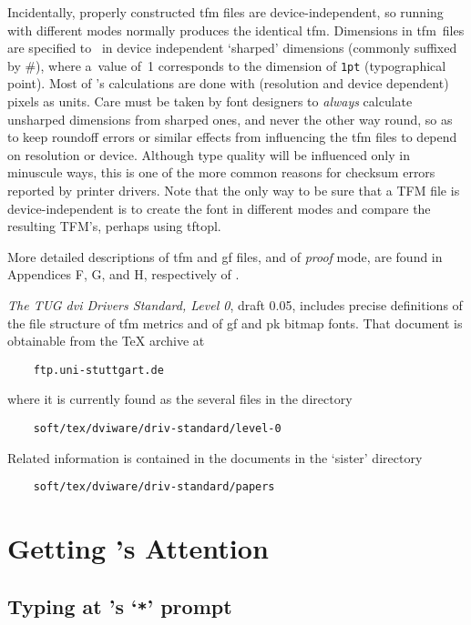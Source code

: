 Incidentally, properly constructed {\sc tfm} files are
device-independent, so running \MF{} with different modes normally
produces the identical {\sc tfm}.
Dimensions in {\sc tfm}~files are specified to~\MF{} in device
independent `sharped' dimensions (commonly suffixed by \#), where
a~value of~1 corresponds to the dimension of {\tt 1pt} (typographical
point).  Most of \MF{}'s calculations are done with (resolution and
device dependent) pixels as units.  Care must be taken by font
designers to {\em always\/} calculate unsharped dimensions from sharped
ones, and never the other way round, so as to keep roundoff errors or
similar effects from influencing the {\sc tfm} files to depend on
resolution or device.  Although type quality will be influenced only in
minuscule ways, this is one of the more common reasons for checksum
errors reported by printer drivers.
Note that the only way to be sure that a TFM file is device-independent
is to create the font in different modes and compare the resulting
TFM's, perhaps using {\sf tftopl}.

More detailed descriptions of {\sc tfm} and {\sc gf} files, and of
{\em proof\/} mode, are found in Appendices F, G, and H, respectively
of \MFbook{}.

{\sl The TUG {\sc dvi} Drivers Standard, Level 0}, draft 0.05, includes
precise definitions of the file structure of {\sc tfm} metrics and of
{\sc gf} and {\sc pk} bitmap fonts.
That document is obtainable from the \TeX{} archive at
\begin{verbatim}
    ftp.uni-stuttgart.de
\end{verbatim}
where it is currently found as the several files in the directory
\begin{verbatim}
    soft/tex/dviware/driv-standard/level-0
\end{verbatim}
Related information is contained in the documents in the `sister'
directory
\begin{verbatim}
    soft/tex/dviware/driv-standard/papers
\end{verbatim}


\section{Getting \MF{}'s Attention}\label{sec:typing}


\subsection{Typing at \MF{}'s `{\tt **}' prompt}\label{sub:starstar}

